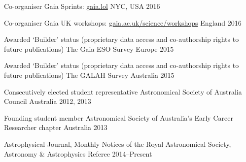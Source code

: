 
\begin{cventries}

  \cventry
    {Co-organiser}
    {Gaia Sprints: \url{gaia.lol}}
    {NYC, USA}
    {2016}
    {}
    
  \cventry
    {Co-organiser}
    {Gaia UK workshops: \url{gaia.ac.uk/science/workshops}}
    {England}
    {2016}
    {}

    
  \cventry
    {Awarded `Builder' status (proprietary data access and co-authorship rights to future publications)}
    {The Gaia-ESO Survey}
    {Europe}
    {2015}
    {}
    
  \cventry
    {Awarded `Builder' status (proprietary data access and co-authorship rights to future publications)}
    {The GALAH Survey}
    {Australia}
    {2015}
    {} 
   
  \cventry
    {Consecutively elected student representative}
    {Astronomical Society of Australia Council} 
    {Australia}
    {2012, 2013}
    {}

  \cventry
    {Founding student member}
    {Astronomical Society of Australia's Early Career Researcher chapter} 
    {Australia}
    {2013}
    {}

  \cventry
    {Astrophysical Journal, Monthly Notices of the Royal Astronomical Society, Astronomy \& Astrophysics}
    {Referee}
    {}
    {2014--Present} %
    {}

\end{cventries}
